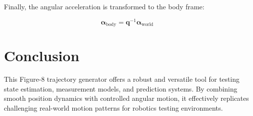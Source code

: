 \documentclass{article}
\begin{document}
	Finally, the angular acceleration is transformed to the body frame:

	\[
	\boldsymbol{\alpha}_{\text{body}} = \mathbf{q}^{-1} \boldsymbol{\alpha}_{\text{world}}
	\]

	\section{Conclusion}
	This Figure-8 trajectory generator offers a robust and versatile tool for testing state estimation, measurement models, and prediction systems. By combining smooth position dynamics with controlled angular motion, it effectively replicates challenging real-world motion patterns for robotics testing environments.
\end{document}
